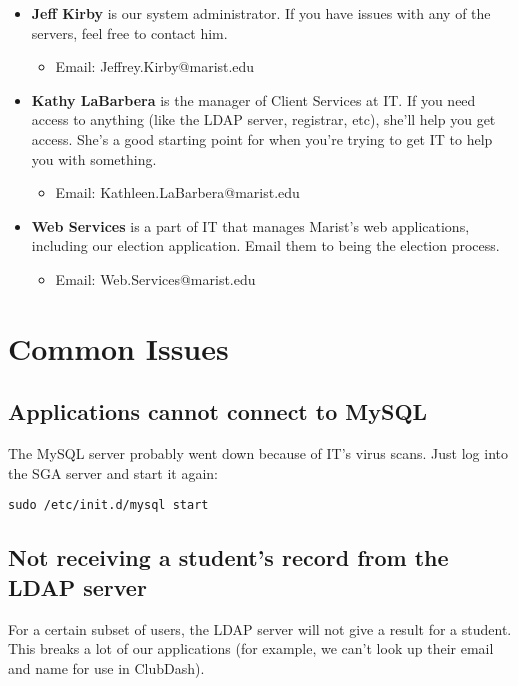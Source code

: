 \documentclass[11pt]{report}
\begin{document}
		\begin{itemize}
			\item{
				\textbf{Jeff Kirby} is our system administrator. If you have issues with any of the servers, feel free to contact him.
				\begin{itemize}
					\item Email: Jeffrey.Kirby@marist.edu
				\end{itemize}
			}
			\item{
				\textbf{Kathy LaBarbera} is the manager of Client Services at IT. If you need access to anything (like the LDAP server, registrar, etc), she'll help you get access. She's a good starting point for when you're trying to get IT to help you with something.
				\begin{itemize}
					\item Email: Kathleen.LaBarbera@marist.edu
				\end{itemize}
			}
			\item{
				\textbf{Web Services} is a part of IT that manages Marist's web applications, including our election application. Email them to being the election process.
				\begin{itemize}
					\item Email: Web.Services@marist.edu
				\end{itemize}
			}
		\end{itemize}


\chapter{Common Issues}
	\section{Applications cannot connect to MySQL}
		The MySQL server probably went down because of IT's virus scans. Just log into the SGA server and start it again:
		
		\begin{lstlisting}
sudo /etc/init.d/mysql start
		\end{lstlisting}
	
	\section{Not receiving a student's record from the LDAP server}
		For a certain subset of users, the LDAP server will not give a result for a student. This breaks a lot of our applications (for example, we can't look up their email and name for use in ClubDash).
		
\end{document}
